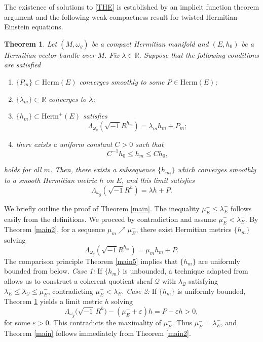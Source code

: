 \documentclass[12pt, reqno]{amsart}
\newcommand\sQ{{\mathscr Q}}
\theoremstyle{plain}
\newtheorem{thm}{Theorem}[section]
\theoremstyle{definition}
\newcommand{\btheorem}{\begin{thm}}
\newcommand{\etheorem}{\end{thm}}
\newcommand{\sq}{\sqrt{-1}}
\newcommand{\beq}{\begin{equation}}
\newcommand{\eeq}{\end{equation}}
\newcommand{\bd}{\begin{enumerate}}
\newcommand{\ed}{\end{enumerate}}
\renewcommand{\>}{\rightarrow}
\newcommand{\R}{{\mathbb R}}
\renewcommand{\>}{\rightarrow}
\numberwithin{equation}{section} %
\begin{document}
The existence of solutions to \eqref{THE} is established by  an implicit function theorem argument
and the following weak compactness result for twisted Hermitian-Einstein equations.
\btheorem\label{main4} Let $ (M,\omega_g) $ be a compact Hermitian manifold and $ (E, h_0)$ be a Hermitian vector bundle over $M$. Fix $\lambda\in \R$.  Suppose that the following conditions are satisfied  \bd \item
$\{ P_m \} \subset \mathrm{Herm}(E)$
converges smoothly to some $P \in \mathrm{Herm}(E)$;
\item $\{\lambda_m\}\subset \R$ converges to $\lambda$;
\item  $\{h_m\} \subset \mathrm{Herm}^+(E)$ satisfies
\beq 
\Lambda_{\omega_g} \left(\sqrt{-1} R^{h_m}\right) = \lambda_m h_m + P_m;\eeq
\item  there exists a uniform constant $C>0$ such that
\begin{equation}
C^{-1} h_0 \leq h_m \leq C h_0,
\end{equation}
\ed  holds for all $m$.
Then, there exists a subsequence $\{h_{m_i}\}$ which converges smoothly to a smooth Hermitian metric $h$ on $E$, and this limit satisfies
\begin{equation}
\Lambda_{\omega_g}\left(\sq  R^{h} \right)= \lambda h + P.
\end{equation}
\etheorem

\noindent We briefly outline the proof of Theorem \ref{main}. The inequality $\mu_E^- \leq \lambda_E^-$ follows easily
from the definitions. We proceed by contradiction and assume $\mu_E^- <
\lambda_E^-$. By Theorem \ref{main2}, for a sequence $\mu_m \nearrow
\mu_E^-$, there exist Hermitian metrics $\{h_m\}$ solving \beq
\Lambda_{\omega_g}\left(\sq R^{h_m}\right) = \mu_m h_m+P. \eeq The comparison principle Theorem \ref{main5}
implies that $\{h_m\}$ are uniformly bounded from below. \emph{Case
1:} If $\{h_m\}$ is unbounded, a technique adapted from \cite{UY86}
allows us to construct a coherent quotient sheaf $\sQ$ with
$\lambda_{\sQ}$ satisfying $\lambda_E^- \leq \lambda_{\sQ} \leq \mu_E^-$,
contradicting $\mu_E^- < \lambda_E^-$. \emph{Case 2:} If $\{h_m\}$ is
uniformly bounded, Theorem
\ref{main4} yields a limit metric $h$ solving
\begin{equation}\label{eq:contradiction_limit}
\Lambda_{\omega_g}\bigl(\sqrt{-1}\, R^h\bigr) - (\mu_E^-+\varepsilon)h = P-\varepsilon h>0,
\end{equation}
for some $\varepsilon > 0$. This contradicts the maximality of $\mu_E^-$.
Thus $\mu_E^- = \lambda_E^-$, and Theorem \ref{main} follows immediately from Theorem \ref{main2}.\\
\end{document}
